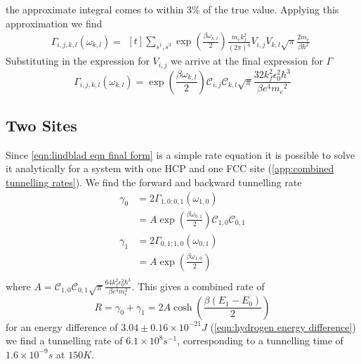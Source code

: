 the approximate
integral comes
to within \(3\% \)
of the true value.
Applying this approximation
we find
\begin{equation}
    \Gamma_{i,j, k,l}(\omega_{k,l}) =\begin{aligned}[t]
        \sum_{s^1,s^3} \exp{(\frac{\beta \omega_{k,l}}{2})} \frac{m_e k_f^2 }{{(2\pi)}^4}
        V_{i,j} V_{k,l} \sqrt{\pi} \frac{2m_e}{\beta \hbar^2}
    \end{aligned}
\end{equation}
Substituting in the expression
for \(V_{i,j}\)
we arrive at the final
expression for \(\Gamma \)
\begin{equation}
    \Gamma_{i,j, k,l}(\omega_{k,l})   =
    \exp{(\frac{\beta \omega_{k,l}}{2})}
    \mathcal{C}_{i,j} \mathcal{C}_{k,l}
    \sqrt{\pi} \frac{32 k_f^2 \epsilon_0^2 \hbar^3}{\beta e^4 {m_e}^2}
\end{equation}


\subsection{Two Sites}
Since \cref{eqn:lindblad eqn final form}
is a simple rate equation
it is possible to solve it analytically
for a system
with one HCP and one FCC site
(\cref{app:combined tunnelling rates}).
We find the
forward and backward tunnelling rate
\begin{align}
    \gamma_0 & = 2\Gamma_{1,0;0, 1}(\omega_{1,0})       \\
             & = A \exp{(\frac{\beta \omega_{0,1}}{2})}
    \mathcal{C}_{1,0} \mathcal{C}_{0,1}                 \\
    \gamma_1 & = 2\Gamma_{0,1;1, 0}(\omega_{0,1})       \\
             & = A \exp{(\frac{\beta \omega_{1,0}}{2})} \\
\end{align}
where
\(A =
\mathcal{C}_{1,0} \mathcal{C}_{0,1}
\sqrt{\pi}
\frac{64 k_f^2 \epsilon_0^2 \hbar^3}{\beta e^4 m_e^2}\).
This gives a combined rate of
\begin{equation}
    R = \gamma_0 + \gamma_1 = 2A\cosh{(\frac{\beta (E_1 - E_0)}{2})}
    \label{eqn:theoretical rate Lindblad equation}
\end{equation}
for an energy difference of
\(3.04\pm0.16\times{}10^{-21} J\)
(\cref{eqn:hydrogen energy difference})
we find a tunnelling rate of
\(6.1\times{}10^{8}s^{-1}\),
corresponding to a
tunnelling time of
\(1.6\times{}10^{-9}s\) at
\(150K\).


